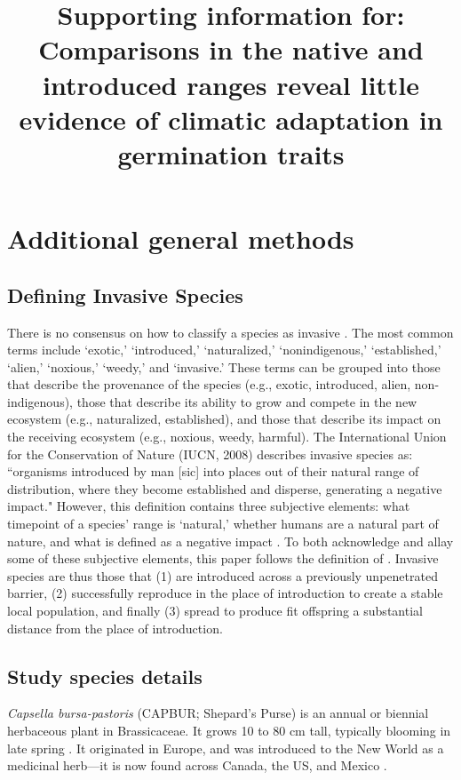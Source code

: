 \documentclass[12pt]{article}\usepackage[]{graphicx}\usepackage[]{color}
\title{\textbf{Supporting information for:}  \\ \bigskip Comparisons in the native and introduced ranges reveal little evidence of climatic adaptation in germination traits} %
\begin{document}
\maketitle
\tableofcontents
\section{Additional general methods}
\subsection{Defining Invasive Species}
There is no consensus on how to classify a species as invasive \parencite{Colautti2004}. The most common terms include `exotic,' `introduced,' `naturalized,' `nonindigenous,' `established,' `alien,' `noxious,' `weedy,' and `invasive.' These terms can be grouped into those that describe the provenance of the species (e.g., exotic, introduced, alien, non-indigenous), those that describe its ability to grow and compete in the new ecosystem (e.g., naturalized, established), and those that describe its impact on the receiving ecosystem (e.g., noxious, weedy, harmful). The International Union for the Conservation of Nature (IUCN, 2008) describes invasive species as: ``organisms introduced by man [sic] into places out of their natural range of distribution, where they become established and disperse, generating a negative impact." \nocite{IUCN2008is} However, this definition contains three subjective elements: what timepoint of a species' range is `natural,' whether humans are a natural part of nature, and what is defined as a negative impact \parencite{Munro2019}. To both acknowledge and allay some of these subjective elements, this paper follows the definition of \textcite{Richardson2000,Richardson2011}. Invasive species are thus those that (1) are introduced across a previously unpenetrated barrier, (2) successfully reproduce in the place of introduction to create a stable local population, and finally (3) spread to produce fit offspring a substantial distance from the place of introduction.

\subsection{Study species details}
\textit{Capsella bursa-pastoris} (CAPBUR; Shepard's Purse) is an annual or biennial herbaceous plant in Brassicaceae. It grows 10 to 80 cm tall, typically blooming in late spring \parencite{Defelice2001}. It originated in Europe, and was introduced to the New World as a medicinal herb---it is now found across Canada, the US, and Mexico \parencite{Westrich1989}.
	
\end{document}
